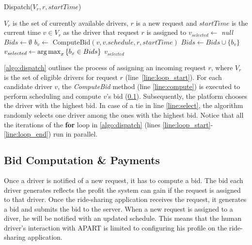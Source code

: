 \begin{algorithm}
\caption{Dispatch($V_r, r, startTime$)}
\label{algo:dispatch}
\begin{algorithmic}[1]
\REQUIRE $V_r$ is the set of currently available drivers, $r$ is a new request and $startTime$ is the current time
\ENSURE $v \in V_r$ as the driver that request $r$ is assigned to
\STATE $v_{selected} \leftarrow $ \emph{null}
\STATE $Bids \leftarrow \emptyset$
 \label{line:loop_start}
	\STATE $b_v \leftarrow $ ComputeBid$(v, v.schedule, r, startTime)$ \label{line:compute}
	\STATE $Bids \leftarrow Bids \cup \{b_v\}$
\ENDFOR \label{line:loop_end}
\STATE $v_{selected} \leftarrow \operatorname*{arg\,max}_x \left\lbrace b_x \in Bids \right\rbrace$ \label{line:select}
\RETURN $v_{selected}$
\end{algorithmic}
\end{algorithm}
\vspace{-3mm}
\cref{algo:dispatch} outlines the process of assigning an incoming request $r$, where $V_r$ is the set of eligible drivers for request $r$ (line~\ref{line:loop_start}). For each candidate driver $v$, the \emph{ComputeBid} method (line \ref{line:compute}) is executed to perform scheduling and compute $v$'s bid (\cref{subsec:bidcomp}). Subsequently, the platform chooses the driver with the highest bid. In case of a tie in line \ref{line:select}, the algorithm randomly selects one driver among the ones with the highest bid. Notice that all the iterations of the \textbf{for} loop in \cref{algo:dispatch} (lines \ref{line:loop_start}-\ref{line:loop_end}) run in parallel.

\subsection{Bid Computation \& Payments}
\label{subsec:bidcomp}

Once a driver is notified of a new request, it has to compute a bid. The bid each driver generates reflects the profit the system can gain if the request is assigned to that driver. Once the ride-sharing application receives the request, it generates a bid and submits the bid to the server. When a new request is assigned to a diver, he will be notified with an updated schedule. This means that the human driver's interaction with APART is limited to configuring his profile on the ride-sharing application.

